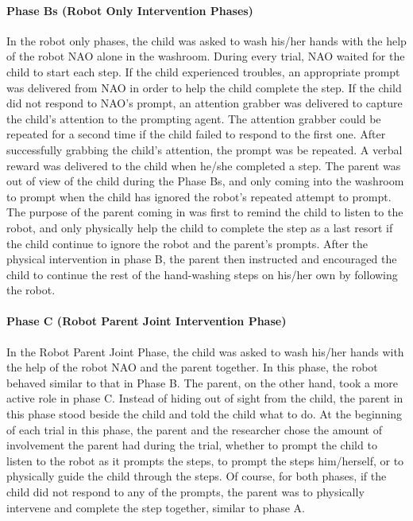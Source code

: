 \paragraph{Phase Bs (Robot Only Intervention Phases)}
In the robot only phases, the child was asked to wash his/her hands with the help of the robot NAO alone in the washroom. During every trial, NAO waited for the child to start each step. If the child experienced troubles, an appropriate prompt was delivered from NAO in order to help the child complete the step. If the child did not respond to NAO's prompt, an attention grabber was delivered to capture the child's attention to the prompting agent. The attention grabber could be repeated for a second time if the child failed to respond to the first one.  After successfully grabbing the child's attention, the prompt was be repeated.  A verbal reward was delivered to the child when he/she completed a step.  The parent was out of view of the child during the Phase Bs, and only coming into the washroom to prompt when the child has ignored the robot's repeated attempt to prompt.  The purpose of the parent coming in was first to remind the child to listen to the robot, and only physically help the child to complete the step as a last resort if the child continue to ignore the robot and the parent's prompts.  After the physical intervention in phase B, the parent then instructed and encouraged the child to continue the rest of the hand-washing steps on his/her own by following the robot.


\paragraph{Phase C (Robot Parent Joint Intervention Phase)}
In the Robot Parent Joint Phase, the child was asked to wash his/her hands with the help of the robot NAO and the parent together.  In this phase, the robot behaved similar to that in Phase B.  The parent, on the other hand, took a more active role in phase C.  Instead of hiding out of sight from the child, the parent in this phase stood beside the child and told the child what to do.  At the beginning of each trial in this phase, the parent and the researcher chose the amount of involvement the parent had during the trial, whether to prompt the child to listen to the robot as it prompts the steps, to prompt the steps him/herself, or to physically guide the child through the steps.  Of course, for both phases, if the child did not respond to any of the prompts, the parent was to physically intervene and complete the step together, similar to phase A.

